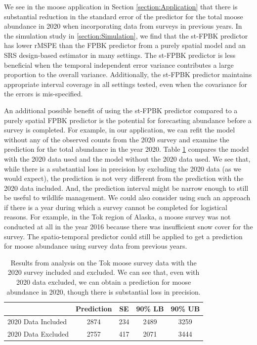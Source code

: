 \documentclass[]{interact}
\theoremstyle{plain}%
\theoremstyle{definition}
\theoremstyle{remark}
\begin{document}
We see in the moose application in Section \ref{section:Application}
that there is substantial reduction in the standard error of the
predictor for the total moose abundance in 2020 when incorporating data
from surveys in previous years. In the simulation study in
\ref{section:Simulation}, we find that the st-FPBK predictor has lower
rMSPE than the FPBK predictor from a purely spatial model and an SRS
design-based estimator in many settings. The st-FPBK predictor is less
beneficial when the temporal independent error variance contributes a
large proportion to the overall variance. Additionally, the st-FPBK
predictor maintains appropriate interval coverage in all settings
tested, even when the covariance for the errors is mis-specified.

An additional possible benefit of using the st-FPBK predictor compared
to a purely spatial FPBK predictor is the potential for forecasting
abundance before a survey is completed. For example, in our application,
we can refit the model without any of the observed counts from the 2020
survey and examine the prediction for the total abundance in the year
2020. Table \ref{tab:forecast} compares the model with the 2020 data
used and the model without the 2020 data used. We see that, while there
is a substantial loss in precision by excluding the 2020 data (as we
would expect), the prediction is not very different from the prediction
with the 2020 data included. And, the prediction interval might be
narrow enough to still be useful to wildlife management. We could also
consider using such an approach if there is a year during which a survey
cannot be completed for logistical reasons. For example, in the Tok
region of Alaska, a moose survey was not conducted at all in the year
2016 because there was insufficient snow cover for the survey. The
spatio-temporal predictor could still be applied to get a prediction for
moose abundance using survey data from previous years.

\begin{table}[H]

\caption{\label{tab:forecast}Results from analysis on the Tok moose survey data with the 2020 survey included and excluded. We can see that, even with 2020 data excluded, we can obtain a prediction for moose abundance in 2020, though there is substantial loss in precision.}
\centering
\begin{tabular}[t]{lcccc}
\toprule
  & Prediction & SE & 90\% LB & 90\% UB\\
\midrule
2020 Data Included & 2874 & 234 & 2489 & 3259\\
2020 Data Excluded & 2757 & 417 & 2071 & 3444\\
\bottomrule
\end{tabular}
\end{table}
\end{document}

